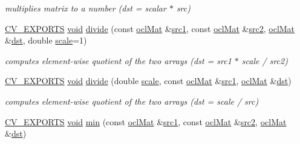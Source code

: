 \begin{DoxyCompactItemize}
\begin{DoxyCompactList}\small\item\em multiplies matrix to a number (dst = scalar $\ast$ src) \end{DoxyCompactList}\item 
\hyperlink{core_2types__c_8h_a1bf9f0e121b54272da02379cfccd0a2b}{C\-V\-\_\-\-E\-X\-P\-O\-R\-T\-S} \hyperlink{legacy_8hpp_a8bb47f092d473522721002c86c13b94e}{void} \hyperlink{namespacecv_1_1ocl_a2302a10291d7fe7c6d878d2b7410e86b}{divide} (const \hyperlink{classcv_1_1ocl_1_1oclMat}{ocl\-Mat} \&\hyperlink{core__c_8h_a897de4702c922f4cccda0d57ccdcafb3}{src1}, const \hyperlink{classcv_1_1ocl_1_1oclMat}{ocl\-Mat} \&\hyperlink{core__c_8h_a7561a36d48069d54a6c8ac4e4750edfd}{src2}, \hyperlink{classcv_1_1ocl_1_1oclMat}{ocl\-Mat} \&\hyperlink{photo__c_8h_aed13e2a25279b24dc954073233fef7a5}{dst}, double \hyperlink{objdetect_8hpp_a1f622eb9b9e06b30862ca90cdf2c078b}{scale}=1)
\begin{DoxyCompactList}\small\item\em computes element-\/wise quotient of the two arrays (dst = src1 $\ast$ scale / src2) \end{DoxyCompactList}\item 
\hyperlink{core_2types__c_8h_a1bf9f0e121b54272da02379cfccd0a2b}{C\-V\-\_\-\-E\-X\-P\-O\-R\-T\-S} \hyperlink{legacy_8hpp_a8bb47f092d473522721002c86c13b94e}{void} \hyperlink{namespacecv_1_1ocl_a6b22a49fbd2f693786673cf96498cd67}{divide} (double \hyperlink{objdetect_8hpp_a1f622eb9b9e06b30862ca90cdf2c078b}{scale}, const \hyperlink{classcv_1_1ocl_1_1oclMat}{ocl\-Mat} \&\hyperlink{core__c_8h_a897de4702c922f4cccda0d57ccdcafb3}{src1}, \hyperlink{classcv_1_1ocl_1_1oclMat}{ocl\-Mat} \&\hyperlink{photo__c_8h_aed13e2a25279b24dc954073233fef7a5}{dst})
\begin{DoxyCompactList}\small\item\em computes element-\/wise quotient of the two arrays (dst = scale / src) \end{DoxyCompactList}\item 
\hyperlink{core_2types__c_8h_a1bf9f0e121b54272da02379cfccd0a2b}{C\-V\-\_\-\-E\-X\-P\-O\-R\-T\-S} \hyperlink{legacy_8hpp_a8bb47f092d473522721002c86c13b94e}{void} \hyperlink{namespacecv_1_1ocl_affc06ffa469d8b5079b7b96c62cae2f5}{min} (const \hyperlink{classcv_1_1ocl_1_1oclMat}{ocl\-Mat} \&\hyperlink{core__c_8h_a897de4702c922f4cccda0d57ccdcafb3}{src1}, const \hyperlink{classcv_1_1ocl_1_1oclMat}{ocl\-Mat} \&\hyperlink{core__c_8h_a7561a36d48069d54a6c8ac4e4750edfd}{src2}, \hyperlink{classcv_1_1ocl_1_1oclMat}{ocl\-Mat} \&\hyperlink{photo__c_8h_aed13e2a25279b24dc954073233fef7a5}{dst})

\end{DoxyCompactItemize}
